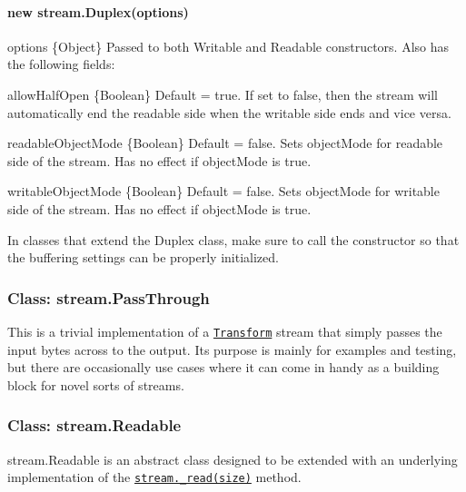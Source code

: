 \paragraph*{new stream.\+Duplex(options)}


\begin{DoxyItemize}
\item {\ttfamily options} \{Object\} Passed to both Writable and Readable constructors. Also has the following fields\+:
\begin{DoxyItemize}
\item {\ttfamily allow\+Half\+Open} \{Boolean\} Default = {\ttfamily true}. If set to {\ttfamily false}, then the stream will automatically end the readable side when the writable side ends and vice versa.
\item {\ttfamily readable\+Object\+Mode} \{Boolean\} Default = {\ttfamily false}. Sets {\ttfamily object\+Mode} for readable side of the stream. Has no effect if {\ttfamily object\+Mode} is {\ttfamily true}.
\item {\ttfamily writable\+Object\+Mode} \{Boolean\} Default = {\ttfamily false}. Sets {\ttfamily object\+Mode} for writable side of the stream. Has no effect if {\ttfamily object\+Mode} is {\ttfamily true}.
\end{DoxyItemize}
\end{DoxyItemize}

In classes that extend the Duplex class, make sure to call the constructor so that the buffering settings can be properly initialized.

\subsubsection*{Class\+: stream.\+Pass\+Through}

This is a trivial implementation of a \href{#stream_class_stream_transform}{\tt Transform} stream that simply passes the input bytes across to the output. Its purpose is mainly for examples and testing, but there are occasionally use cases where it can come in handy as a building block for novel sorts of streams.

\subsubsection*{Class\+: stream.\+Readable}

{\ttfamily stream.\+Readable} is an abstract class designed to be extended with an underlying implementation of the \href{#stream_readable_read_size_1}{\tt {\ttfamily stream.\+\_\+read(size)}} method.

